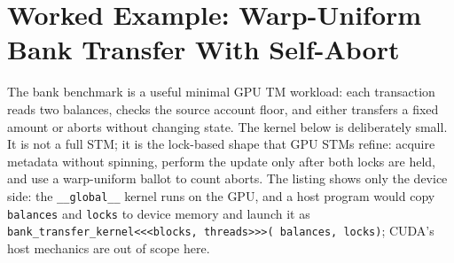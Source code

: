 \section{Worked Example: Warp-Uniform Bank Transfer With Self-Abort}
\label{sec:gpu-bank-transfer-example}

The bank benchmark is a useful minimal GPU TM workload: each transaction reads
two balances, checks the source account floor, and either transfers a fixed
amount or aborts without changing state. The kernel below is deliberately
small. It is not a full STM; it is the lock-based shape that GPU STMs refine:
acquire metadata without spinning, perform the update only after both locks
are held, and use a warp-uniform ballot to count aborts. The listing shows
only the device side: the \texttt{\_\_global\_\_} kernel runs on the GPU, and
a host program would copy \texttt{balances} and \texttt{locks} to device
memory and launch it as \texttt{bank\_transfer\_kernel<<<blocks, threads>>>(
balances, locks)}; CUDA's host mechanics are out of scope here.

